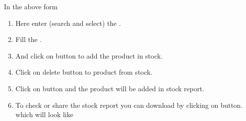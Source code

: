 \documentclass[letterpaper,10pt,english]{sphinxmanual}
\begin{document}
\begin{figure}[htbp]
\centering

\noindent{}
\end{figure}

In the above form
\begin{enumerate}
\item {} 
Here enter (search and select) the  .

\item {} 
Fill the  .

\item {} 
And click on  button to add the product in stock.

\item {} 
Click on delete button to  product from stock.

\item {} 
Click on  button and the product will be added in stock report.

\item {} 
To check or share the stock report you can download by clicking on  button. which will look like

\end{enumerate}

\begin{figure}[htbp]
\centering

\noindent{}
\end{figure}



\renewcommand{\indexname}{Index}
\printindex
\end{document}
